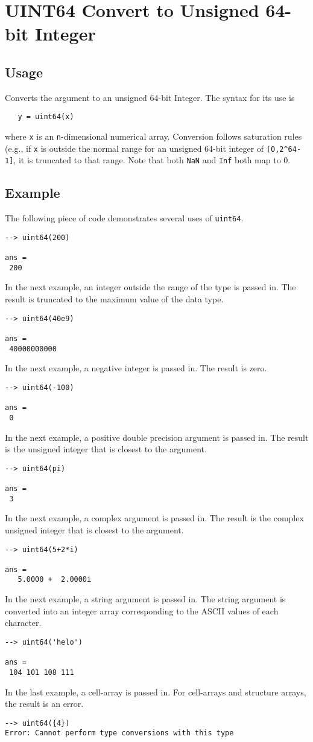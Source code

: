 \section{UINT64 Convert to Unsigned 64-bit Integer}

\subsection{Usage}

Converts the argument to an unsigned 64-bit Integer.  The syntax
for its use is
\begin{verbatim}
   y = uint64(x)
\end{verbatim}
where \verb|x| is an \verb|n|-dimensional numerical array.  Conversion
follows saturation rules (e.g., if \verb|x| is outside the normal
range for an unsigned 64-bit integer of \verb|[0,2^64-1]|, it is
truncated to that range.  Note that both \verb|NaN| and \verb|Inf| both map to 0.
\subsection{Example}

The following piece of code demonstrates several uses of \verb|uint64|.
\begin{verbatim}
--> uint64(200)

ans = 
 200 
\end{verbatim}
In the next example, an integer outside the range  of the type is passed in.
The result is truncated to the maximum value of the data type.
\begin{verbatim}
--> uint64(40e9)

ans = 
 40000000000 
\end{verbatim}
In the next example, a negative integer is passed in.  The result is zero.
\begin{verbatim}
--> uint64(-100)

ans = 
 0 
\end{verbatim}
In the next example, a positive double precision argument is passed in.  
The result is the unsigned integer that is closest to the argument.
\begin{verbatim}
--> uint64(pi)

ans = 
 3 
\end{verbatim}
In the next example, a complex argument is passed in.  The result is the 
complex unsigned integer that is closest to the argument.
\begin{verbatim}
--> uint64(5+2*i)

ans = 
   5.0000 +  2.0000i 
\end{verbatim}
In the next example, a string argument is passed in.  The string argument is 
converted into an integer array corresponding to the ASCII values of each character.
\begin{verbatim}
--> uint64('helo')

ans = 
 104 101 108 111 
\end{verbatim}
In the last example, a cell-array is passed in.  For cell-arrays and structure 
arrays, the result is an error.
\begin{verbatim}
--> uint64({4})
Error: Cannot perform type conversions with this type
\end{verbatim}
